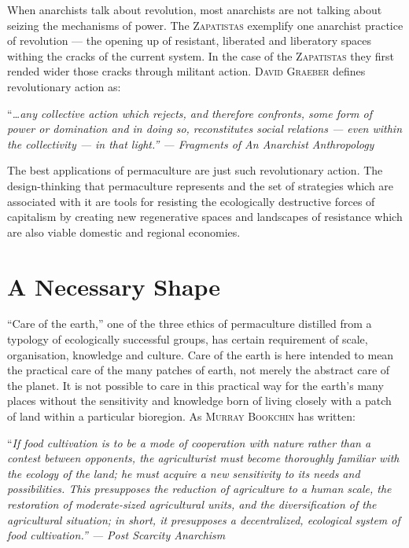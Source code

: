 \documentclass[a4paper, 11pt]{article}
\begin{document}
\begin{multicols*}{2}
When anarchists talk about revolution, most anarchists are not talking about seizing the mechanisms of power.  The \textsc{Zapatistas} exemplify one anarchist practice of revolution --- the opening up of resistant, liberated and liberatory spaces withing the cracks of the current system.  In the case of the \textsc{Zapatistas} they first rended wider those cracks through militant action.  \textsc{David Graeber} defines revolutionary action as:

\vspace{1mm}
``\em{\ldots any collective action which rejects, and therefore confronts, some form of power or domination and in doing so, reconstitutes social relations --- even within the collectivity --- in that light.}\em'' --- \em{Fragments of An Anarchist Anthropology}\em
\vspace{1mm}

The best applications of permaculture are just such revolutionary action.  The design-thinking that permaculture represents and the set of strategies which are associated with it are tools for resisting the ecologically destructive forces of capitalism by creating new regenerative spaces and landscapes of resistance which are also viable domestic and regional economies.

\section*{A Necessary Shape}

``Care of the earth,'' one of the three ethics of permaculture distilled from a typology of ecologically successful groups, has certain requirement of scale, organisation, knowledge and culture.  Care of the earth is here intended to mean the practical care of the many patches of earth, not merely the abstract care of the planet.  It is not possible to care in this practical way for the earth's many places without the sensitivity and knowledge born of living closely with a patch of land within a particular bioregion.  As \textsc{Murray Bookchin} has written:

\vspace{1mm}
``\em{If food cultivation is to be a mode of cooperation with nature rather than a contest between opponents, the agriculturist must become thoroughly familiar with the ecology of the land; he must acquire a new sensitivity to its needs and possibilities. This presupposes the reduction of agriculture to a human scale, the restoration of moderate-sized agricultural units, and the diversification of the agricultural situation; in short, it presupposes a decentralized, ecological system of food cultivation.}\em'' --- \em{Post Scarcity Anarchism}\em
\vspace{1mm}


\end{multicols*}
\end{document}
